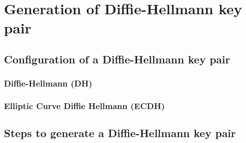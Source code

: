 \chapter{Generation of Diffie-Hellmann key pair}
\label{dhKeys}

\section{Configuration of a Diffie-Hellmann key pair}
\subsection{Diffie-Hellmann (DH)}
\subsection{Elliptic Curve Diffie Hellmann (ECDH)}


\section{Steps to generate a Diffie-Hellmann key pair}